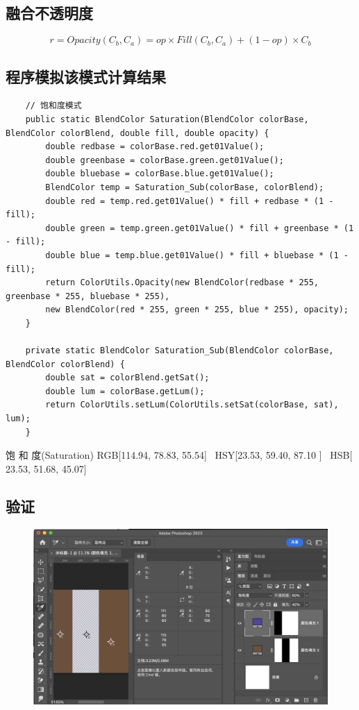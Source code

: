 \subsection{ 融合不透明度}

\begin{equation}r=Opacity(C_b,C_a)=op\times Fill(C_b,C_a)+(1-op)\times C_b\end{equation}

\subsection{ 程序模拟该模式计算结果}

\begin{lstlisting}
	// 饱和度模式
	public static BlendColor Saturation(BlendColor colorBase, BlendColor colorBlend, double fill, double opacity) {
		double redbase = colorBase.red.get01Value();
		double greenbase = colorBase.green.get01Value();
		double bluebase = colorBase.blue.get01Value();
		BlendColor temp = Saturation_Sub(colorBase, colorBlend);
		double red = temp.red.get01Value() * fill + redbase * (1 - fill);
		double green = temp.green.get01Value() * fill + greenbase * (1 - fill);
		double blue = temp.blue.get01Value() * fill + bluebase * (1 - fill);
		return ColorUtils.Opacity(new BlendColor(redbase * 255, greenbase * 255, bluebase * 255),
		new BlendColor(red * 255, green * 255, blue * 255), opacity);
	}
	
	private static BlendColor Saturation_Sub(BlendColor colorBase, BlendColor colorBlend) {
		double sat = colorBlend.getSat();
		double lum = colorBase.getLum();
		return ColorUtils.setLum(ColorUtils.setSat(colorBase, sat), lum);
	}
\end{lstlisting}


\begin{result}
\item 饱 和 度(Saturation)    RGB[114.94,  78.83,  55.54]~ HSY[23.53,  59.40,  87.10 ]~ HSB[ 23.53,  51.68,  45.07]
\end{result}
\newpage
\subsection{ 验证}
\begin{figure}[h!]
	\centering
	\includegraphics[width=\linewidth]{figure/saturation}
	\caption{}
	\label{fig:saturation}
\end{figure}

